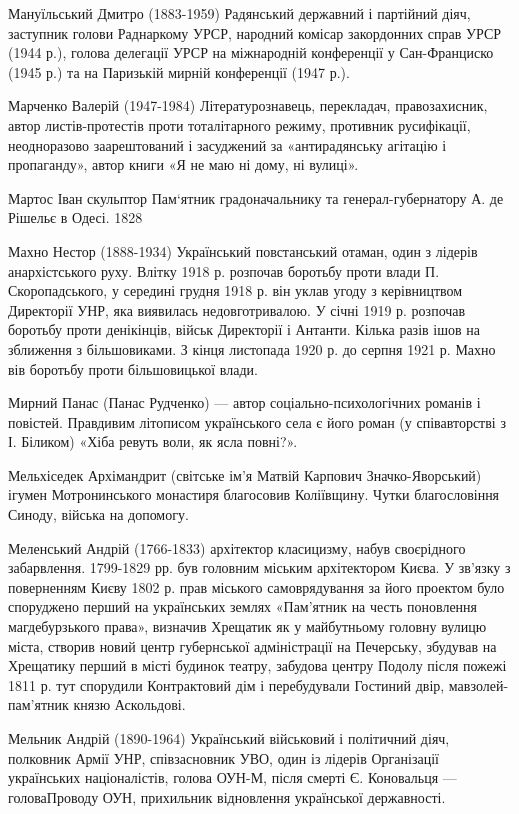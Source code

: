 Мануїльський Дмитро (1883-1959) Радянський державний і партійний діяч, заступник голови Раднаркому УРСР, народний комісар закордонних справ УРСР (1944 р.), голова делегації УРСР на міжнародній конференції у Сан-Франциско (1945 р.) та на Паризькій мирній конференції (1947 р.).

Марченко Валерій (1947-1984) Літературознавець, перекладач, правозахисник, автор листів-протестів проти тоталітарного режиму, противник русифікації, неодноразово заарештований і засуджений за «антирадянську агітацію і пропаганду», автор книги «Я не маю ні дому, ні вулиці».

Мартос Іван скульптор  Пам‘ятник градоначальнику та генерал-губернатору А. де Рішельє в Одесі. 1828 

Махно Нестор (1888-1934) Український повстанський отаман, один з лідерів анархістського руху. Влітку 1918 р. розпочав боротьбу проти влади П. Скоропадського, у середині грудня 1918 р. він уклав угоду з керівництвом Директорії УНР, яка виявилась недовготривалою. У січні 1919 р. розпочав боротьбу проти денікінців, військ Директорії і Антанти. Кілька разів ішов на зближення з більшовиками. З кінця листопада 1920 р. до серпня 1921 р. Махно вів боротьбу проти більшовицької влади. 

Мирний Панас  (Панас Рудченко) --- автор соціально-психологічних романів і повістей. Правдивим літописом українського села є його роман (у співавторстві з І. Біликом) «Хіба ревуть воли, як ясла повні?». 

Мельхіседек Архімандрит (світське ім'я Матвій Карпович Значко-Яворський)  ігумен Мотронинського монастиря  благосовив Коліївщину. Чутки благословіння Синоду, війська на допомогу. 

Меленський Андрій (1766-1833) архітектор класицизму, набув своєрідного забарвлення. 1799-1829 рр. був головним міським архітектором Києва. У зв’язку з поверненням Києву 1802 р. прав міського самоврядування за його проектом було споруджено перший на українських землях «Пам’ятник на честь поновлення магдебурзького права», визначив Хрещатик як у майбутньому головну вулицю міста, створив новий центр губернської адміністрації на Печерську, збудував на Хрещатику перший в місті будинок театру, забудова центру Подолу після пожежі 1811 р. тут спорудили Контрактовий дім і перебудували Гостиний двір,  мавзолей-пам’ятник князю Аскольдові. 

Мельник Андрій (1890-1964) Український військовий і політичний діяч, полковник Армії УНР, співзасновник УВО, один із лідерів Організації українських націоналістів, голова ОУН-М, після смерті Є. Коновальця --- головаПроводу ОУН, прихильник відновлення української державності. 

